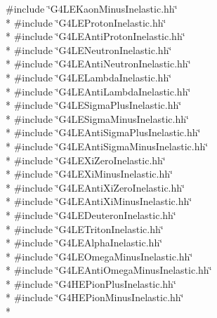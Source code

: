 {\ttfamily \#include \char`\"{}G4\+L\+E\+Kaon\+Minus\+Inelastic.\+hh\char`\"{}}\\*
{\ttfamily \#include \char`\"{}G4\+L\+E\+Proton\+Inelastic.\+hh\char`\"{}}\\*
{\ttfamily \#include \char`\"{}G4\+L\+E\+Anti\+Proton\+Inelastic.\+hh\char`\"{}}\\*
{\ttfamily \#include \char`\"{}G4\+L\+E\+Neutron\+Inelastic.\+hh\char`\"{}}\\*
{\ttfamily \#include \char`\"{}G4\+L\+E\+Anti\+Neutron\+Inelastic.\+hh\char`\"{}}\\*
{\ttfamily \#include \char`\"{}G4\+L\+E\+Lambda\+Inelastic.\+hh\char`\"{}}\\*
{\ttfamily \#include \char`\"{}G4\+L\+E\+Anti\+Lambda\+Inelastic.\+hh\char`\"{}}\\*
{\ttfamily \#include \char`\"{}G4\+L\+E\+Sigma\+Plus\+Inelastic.\+hh\char`\"{}}\\*
{\ttfamily \#include \char`\"{}G4\+L\+E\+Sigma\+Minus\+Inelastic.\+hh\char`\"{}}\\*
{\ttfamily \#include \char`\"{}G4\+L\+E\+Anti\+Sigma\+Plus\+Inelastic.\+hh\char`\"{}}\\*
{\ttfamily \#include \char`\"{}G4\+L\+E\+Anti\+Sigma\+Minus\+Inelastic.\+hh\char`\"{}}\\*
{\ttfamily \#include \char`\"{}G4\+L\+E\+Xi\+Zero\+Inelastic.\+hh\char`\"{}}\\*
{\ttfamily \#include \char`\"{}G4\+L\+E\+Xi\+Minus\+Inelastic.\+hh\char`\"{}}\\*
{\ttfamily \#include \char`\"{}G4\+L\+E\+Anti\+Xi\+Zero\+Inelastic.\+hh\char`\"{}}\\*
{\ttfamily \#include \char`\"{}G4\+L\+E\+Anti\+Xi\+Minus\+Inelastic.\+hh\char`\"{}}\\*
{\ttfamily \#include \char`\"{}G4\+L\+E\+Deuteron\+Inelastic.\+hh\char`\"{}}\\*
{\ttfamily \#include \char`\"{}G4\+L\+E\+Triton\+Inelastic.\+hh\char`\"{}}\\*
{\ttfamily \#include \char`\"{}G4\+L\+E\+Alpha\+Inelastic.\+hh\char`\"{}}\\*
{\ttfamily \#include \char`\"{}G4\+L\+E\+Omega\+Minus\+Inelastic.\+hh\char`\"{}}\\*
{\ttfamily \#include \char`\"{}G4\+L\+E\+Anti\+Omega\+Minus\+Inelastic.\+hh\char`\"{}}\\*
{\ttfamily \#include \char`\"{}G4\+H\+E\+Pion\+Plus\+Inelastic.\+hh\char`\"{}}\\*
{\ttfamily \#include \char`\"{}G4\+H\+E\+Pion\+Minus\+Inelastic.\+hh\char`\"{}}\\*
